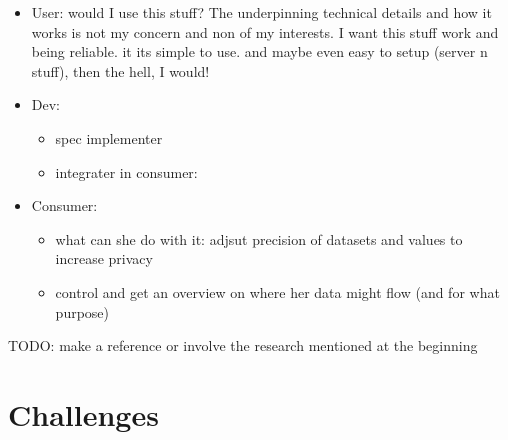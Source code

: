 \documentclass[12pt,english,a4paper,titlepage,cleardoublepage=empty,dottedtoc]{report}
\providecommand{\tightlist}{%
  \setlength{\itemsep}{0pt}\setlength{\parskip}{0pt}}
\begin{document}
\begin{itemize}
\tightlist
\item
  User: would I use this stuff? The underpinning technical details and
  how it works is not my concern and non of my interests. I want this
  stuff work and being reliable. it its simple to use. and maybe even
  easy to setup (server n stuff), then the hell, I would!
\item
  Dev:

  \begin{itemize}
  \tightlist
  \item
    spec implementer
  \item
    integrater in consumer:
  \end{itemize}
\item
  Consumer:

  \begin{itemize}
  \tightlist
  \item
    what can she do with it: adjsut precision of datasets and values to
    increase privacy
  \item
    control and get an overview on where her data might flow (and for
    what purpose)
  \end{itemize}
\end{itemize}

TODO: make a reference or involve the research mentioned at the
beginning

\section{Challenges}\label{challenges}
\end{document}

